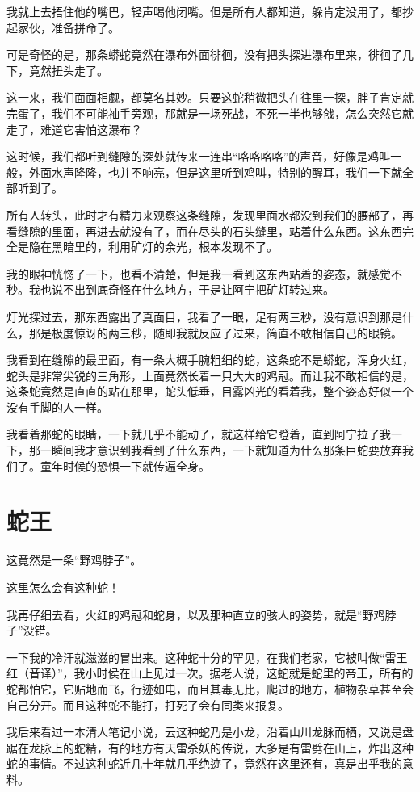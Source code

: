我就上去捂住他的嘴巴，轻声喝他闭嘴。但是所有人都知道，躲肯定没用了，都抄起家伙，准备拼命了。

可是奇怪的是，那条蟒蛇竟然在瀑布外面徘徊，没有把头探进瀑布里来，徘徊了几下，竟然扭头走了。

这一来，我们面面相觑，都莫名其妙。只要这蛇稍微把头在往里一探，胖子肯定就完蛋了，我们不可能袖手旁观，那就是一场死战，不死一半也够戗，怎么突然它就走了，难道它害怕这瀑布？

这时候，我们都听到缝隙的深处就传来一连串“咯咯咯咯”的声音，好像是鸡叫一般，外面水声隆隆，也并不响亮，但是这里听到鸡叫，特别的醒耳，我们一下就全部听到了。

所有人转头，此时才有精力来观察这条缝隙，发现里面水都没到我们的腰部了，再看缝隙的里面，再进去就没有了，而在尽头的石头缝里，站着什么东西。这东西完全是隐在黑暗里的，利用矿灯的余光，根本发现不了。

我的眼神恍惚了一下，也看不清楚，但是我一看到这东西站着的姿态，就感觉不秒。我也说不出到底奇怪在什么地方，于是让阿宁把矿灯转过来。

灯光探过去，那东西露出了真面目，我看了一眼，足有两三秒，没有意识到那是什么，那是极度惊讶的两三秒，随即我就反应了过来，简直不敢相信自己的眼镜。

我看到在缝隙的最里面，有一条大概手腕粗细的蛇，这条蛇不是蟒蛇，浑身火红，蛇头是非常尖锐的三角形，上面竟然长着一只大大的鸡冠。而让我不敢相信的是，这条蛇竟然是直直的站在那里，蛇头低垂，目露凶光的看着我，整个姿态好似一个没有手脚的人一样。

我看着那蛇的眼睛，一下就几乎不能动了，就这样给它瞪着，直到阿宁拉了我一下，那一瞬间我才意识到我看到了什么东西，一下就知道为什么那条巨蛇要放弃我们了。童年时候的恐惧一下就传遍全身。

\chapter{蛇王}

这竟然是一条“野鸡脖子”。

这里怎么会有这种蛇！

我再仔细去看，火红的鸡冠和蛇身，以及那种直立的骇人的姿势，就是“野鸡脖子”没错。

一下我的冷汗就滋滋的冒出来。这种蛇十分的罕见，在我们老家，它被叫做“雷王红（音译）”，我小时侯在山上见过一次。据老人说，这蛇就是蛇里的帝王，所有的蛇都怕它，它贴地而飞，行迹如电，而且其毒无比，爬过的地方，植物杂草甚至会自己分开。而且这种蛇不能打，打死了会有同类来报复。

我后来看过一本清人笔记小说，云这种蛇乃是小龙，沿着山川龙脉而栖，又说是盘踞在龙脉上的蛇精，有的地方有天雷杀妖的传说，大多是有雷劈在山上，炸出这种蛇的事情。不过这种蛇近几十年就几乎绝迹了，竟然在这里还有，真是出乎我的意料。

